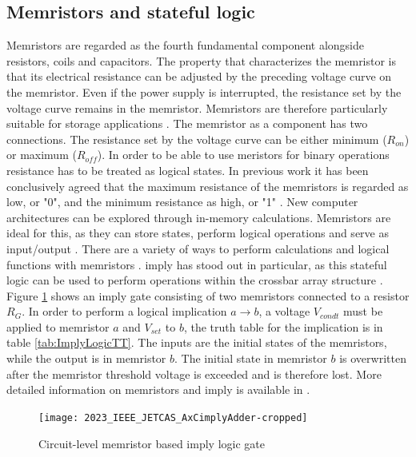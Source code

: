 \documentclass[]{IEEEtran}
\begin{document}
\subsection{Memristors and stateful logic}
Memristors are regarded as the fourth fundamental component alongside resistors, coils and capacitors. The property that characterizes the memristor is that its electrical resistance can be adjusted by the preceding voltage curve on the memristor. Even if the power supply is interrupted, the resistance set by the voltage curve remains in the memristor. Memristors are therefore particularly suitable for storage applications \cite{memristors} \cite{1083337}. 
The memristor as a component has two connections. The resistance set by the voltage curve can be either minimum ($R_{on}$) or maximum ($R_{off}$). In order to be able to use meristors for binary operations resistance has to be treated as logical states. In previous work it has been conclusively agreed that the maximum resistance of the memristors is regarded as low, or "0", and the minimum resistance as high, or "1" \cite{10305490, 10032497, 9841969, 8832255, 8961312, 7946813}.
New computer architectures can be explored through in-memory calculations. Memristors are ideal for this, as they can store states, perform logical operations and serve as input/output \cite{1083337}. There are a variety of ways to perform calculations and logical functions with memristors \cite{9321508, alam-2022, 9741240, 9382267, 8587724, 6895258, 6331426}. \gls{imply} has stood out in particular, as this stateful logic can be used to perform operations within the crossbar array structure \cite{8388838}. Figure \ref{fig:ImplyGate} shows an \gls{imply} gate consisting of two memristors connected to a resistor $R_G$. In order to perform a logical implication $a \rightarrow b$, a voltage $V_{condt}$ must be applied to memristor $a$ and $V_{set}$ to $b$, the truth table for the implication is in table \ref{tab:ImplyLogicTT}. The inputs are the initial states of the memristors, while the output is in memristor $b$. The initial state in memristor $b$ is overwritten after the memristor threshold voltage is exceeded and is therefore lost. More detailed information on memristors and \gls{imply} is available in \cite{borghetti-2010, 5226356, 6617731, 1083337}.

\begin{figure}[h]
	\centering
	\texttt{[image: 2023\_IEEE\_JETCAS\_AxCimplyAdder-cropped]}
	\caption{Circuit-level memristor based \gls{imply} logic gate \cite{10032497}}
	\label{fig:ImplyGate}
\end{figure}
\end{document}
